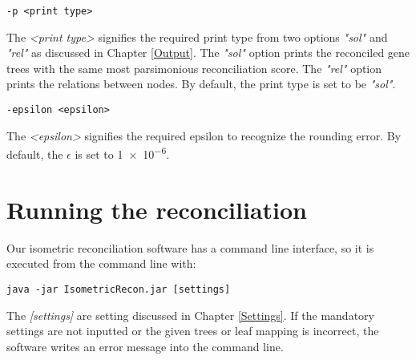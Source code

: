 \documentclass[12pt,a4paper,oneside]{book}
\begin{document}
\begin{verbatim}-p <print type>
\end{verbatim}

The \emph{<print type>} signifies the required print type from two options \emph{"sol"} and \emph{"rel"} as discussed in Chapter \ref{Output}. The \emph{"sol"} option prints the reconciled gene trees with the same most parsimonious reconciliation score. The \emph{"rel"} option prints the relations between nodes. By default, the print type is set to be \emph{"sol"}.

\begin{verbatim}-epsilon <epsilon>
\end{verbatim}

The \emph{<epsilon>} signifies the required epsilon to recognize the rounding error. By default, the $\epsilon$ is set to \num{1e-6}.


\chapter{Running the reconciliation}

Our isometric reconciliation software has a command line interface, so it is executed from the command line with:

\begin{verbatim}
java -jar IsometricRecon.jar [settings]
\end{verbatim}

The \emph{[settings]} are setting discussed in Chapter \ref{Settings}. If the mandatory settings are not inputted or the given trees or leaf mapping is incorrect, the software writes an error message into the command line.

\backmatter
\end{document}
